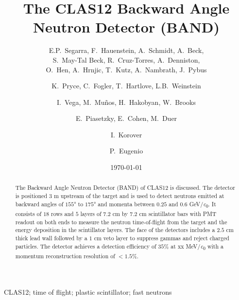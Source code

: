 \documentclass[3p,final,twocolumn]{elsarticle}
\newcommand*{\MIT }{Massachusetts Institute of Technology, Cambridge, Massachusetts 02139, USA}
\newcommand*{\ODU}{Old Dominion University, Norfolk, Virginia 23529}
\newcommand*{\TAU }{School of Physics and Astronomy, Tel Aviv University, Tel Aviv 69978, Israel}
\newcommand*{\NRC}{Nuclear Research Center Negev, Be'er Sheva 84190, Israel}
\begin{document}
\begin{frontmatter}

\title{The CLAS12 Backward Angle Neutron Detector (BAND) }



\author{E.P.~Segarra, F.~Hauenstein, A.~Schmidt, A.~Beck, \\ S.~May-Tal Beck, 
R.~Cruz-Torres, A.~Denniston, \\ O.~Hen, A.~Hrnjic, T.~Kutz, A.~Nambrath,  J.~Pybus }
\address{\MIT}

\author{K.~Pryce, C.~Fogler, T.~Hartlove, L.B.~Weinstein}
\address{\ODU}
\author{I.~Vega, M.~Mu\~nos, H.~Hakobyan, W.~Brooks}
\address{UTFSM}
\author{E.~Piasetzky, E.~Cohen, M.~Duer}
\address{\TAU}
\author{I.~Korover}
\address{\NRC}
\author{P.~Eugenio}
\address{FSU}


\date{\today}

\begin{abstract}
The Backward Angle Neutron Detector (BAND) of CLAS12 is discussed. The detector is positioned $3$ \si{\meter} upstream of the target and is used to 
detect neutrons emitted at backward angles of $155$\si{\degree} to $175$\si{\degree} and momenta between $0.25$ and $0.6$ \si{\GeV/\clight}. It consists of $18$ rows and $5$ layers of $7.2$ \si{\centi\meter} 
by $7.2$ \si{\centi\meter} scintillator bars with PMT readout on both ends to measure the neutron time-of-flight from the target and the 
energy deposition in the scintillator layers. The face of the detectors includes a $2.5$ \si{\centi\meter} thick lead wall followed by a $1$ \si{\centi\meter} veto layer to suppress gammas and reject charged particles. The detector achieves a  detection efficiency of 
$35$\% at xx \si{\MeV/\clight} with a momentum reconstruction resolution of $<1.5$\%.
\end{abstract}

\begin{keyword}
CLAS12; time of flight; plastic scintillator; fast neutrons
\end{keyword}
\end{frontmatter}
\end{document}
